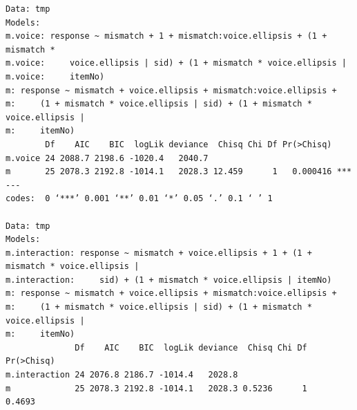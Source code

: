 \documentclass[11pt]{article}
\begin{document}
\begin{verbatim}
Data: tmp
Models:
m.voice: response ~ mismatch + 1 + mismatch:voice.ellipsis + (1 + mismatch * 
m.voice:     voice.ellipsis | sid) + (1 + mismatch * voice.ellipsis | 
m.voice:     itemNo)
m: response ~ mismatch + voice.ellipsis + mismatch:voice.ellipsis + 
m:     (1 + mismatch * voice.ellipsis | sid) + (1 + mismatch * voice.ellipsis | 
m:     itemNo)
        Df    AIC    BIC  logLik deviance  Chisq Chi Df Pr(>Chisq)    
m.voice 24 2088.7 2198.6 -1020.4   2040.7                             
m       25 2078.3 2192.8 -1014.1   2028.3 12.459      1   0.000416 ***
---
codes:  0 ‘***’ 0.001 ‘**’ 0.01 ‘*’ 0.05 ‘.’ 0.1 ‘ ’ 1

Data: tmp
Models:
m.interaction: response ~ mismatch + voice.ellipsis + 1 + (1 + mismatch * voice.ellipsis | 
m.interaction:     sid) + (1 + mismatch * voice.ellipsis | itemNo)
m: response ~ mismatch + voice.ellipsis + mismatch:voice.ellipsis + 
m:     (1 + mismatch * voice.ellipsis | sid) + (1 + mismatch * voice.ellipsis | 
m:     itemNo)
              Df    AIC    BIC  logLik deviance  Chisq Chi Df Pr(>Chisq)
m.interaction 24 2076.8 2186.7 -1014.4   2028.8                         
m             25 2078.3 2192.8 -1014.1   2028.3 0.5236      1     0.4693
\end{verbatim}
\end{document}

